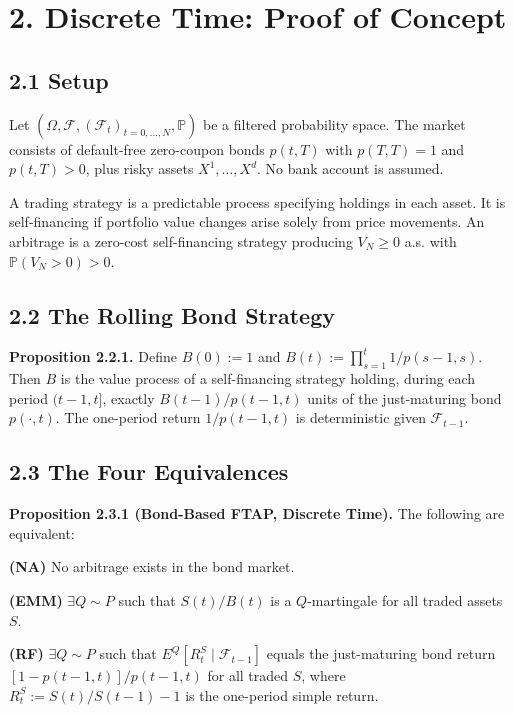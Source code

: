 \documentclass[
]{article}
\begin{document}
\section{2. Discrete Time: Proof of
Concept}\label{discrete-time-proof-of-concept}

\subsection{2.1 Setup}\label{setup}

Let
\((\Omega, \mathcal{F}, (\mathcal{F}_t)_{t=0,\ldots,N}, \mathbb{P})\) be
a filtered probability space. The market consists of default-free
zero-coupon bonds \(p(t,T)\) with \(p(T,T) = 1\) and \(p(t,T) > 0\),
plus risky assets \(X^1,\ldots,X^d\). No bank account is assumed.

A trading strategy is a predictable process specifying holdings in each
asset. It is self-financing if portfolio value changes arise solely from
price movements. An arbitrage is a zero-cost self-financing strategy
producing \(V_N \geq 0\) a.s. with \(\mathbb{P}(V_N > 0) > 0\).

\subsection{2.2 The Rolling Bond
Strategy}\label{the-rolling-bond-strategy}

\textbf{Proposition 2.2.1.} Define \(B(0) := 1\) and
\(B(t) := \prod_{s=1}^{t} 1/p(s-1,s)\). Then \(B\) is the value process
of a self-financing strategy holding, during each period \((t-1,t]\),
exactly \(B(t-1)/p(t-1,t)\) units of the just-maturing bond
\(p(\cdot,t)\). The one-period return \(1/p(t-1,t)\) is deterministic
given \(\mathcal{F}_{t-1}\).

\subsection{2.3 The Four Equivalences}\label{the-four-equivalences}

\textbf{Proposition 2.3.1 (Bond-Based FTAP, Discrete Time).} The
following are equivalent:

\textbf{(NA)} No arbitrage exists in the bond market.

\textbf{(EMM)} \(\exists Q \sim P\) such that \(S(t)/B(t)\) is a
\(Q\)-martingale for all traded assets \(S\).

\textbf{(RF)} \(\exists Q \sim P\) such that
\(E^Q[R_t^S \mid \mathcal{F}_{t-1}]\) equals the just-maturing bond
return \([1 - p(t-1,t)]/p(t-1,t)\) for all traded \(S\), where
\(R_t^S := S(t)/S(t-1) - 1\) is the one-period simple return.
\end{document}
